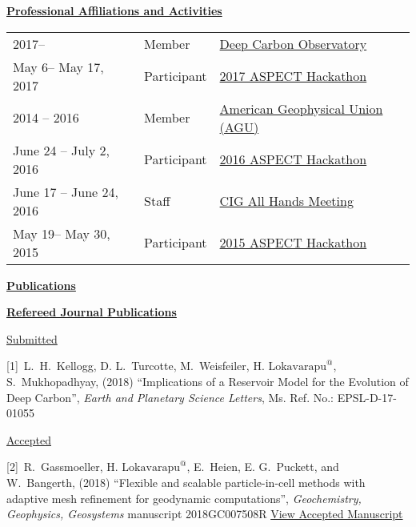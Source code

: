 \documentclass[11pt]{ltxdoc}
\begin{document}
\vskip 12pt

\begin{center}
	\textbf{\underline{Professional Affiliations and Activities}}
\end{center}

\vskip -06pt

\addtolength{\tabcolsep}{15pt}   
\begin{tabular}{lll}
  2017--     & Member & \href{https://deepcarbon.net/}{Deep Carbon Observatory} \\[06pt]
  May 6-- May 17, 2017 & Participant & \href{https://geodynamics.org/cig/events/calendar/2017-aspect-hack/}{2017 ASPECT Hackathon} \\[06pt]
  2014 -- 2016     & Member & 
 \href{ https://sites.agu.org}{ American Geophysical Union (AGU)} \\[06pt]
  June 24 -- July 2, 2016     & Participant & \href{https://geodynamics.org/cig/events/calendar/2016-cig-all-hands-meeting/2016-aspect-hack/}{2016 ASPECT Hackathon} \\[06pt]
  June 17 -- June 24, 2016  & Staff & \href{https://geodynamics.org/cig/events/calendar/2016-cig-all-hands-meeting/}{CIG All Hands Meeting} \\[06pt]
  May 19-- May 30, 2015 & Participant & \href{https://geodynamics.org/cig/events/calendar/2015-aspect-hackathon/}{2015 ASPECT Hackathon} \\[06pt]
\end{tabular}
\addtolength{\tabcolsep}{1pt}  

\newpage

\begin{center}
  \textbf{\underline{Publications}}
\end{center}

\noindent
\textbf{\underline{Refereed Journal Publications}}


\noindent
\underline{Submitted}

\hangindent 20pt
[1]~L.~H.~Kellogg, D. L.~Turcotte, M.~Weisfeiler, $\textrm{H.~Lokavarapu}^@$, S.~Mukhopadhyay, (2018) 
``Implications of a Reservoir Model for the
Evolution of Deep Carbon'', 
\textit{Earth and Planetary Science Letters}, Ms. Ref. No.:  EPSL-D-17-01055

\noindent
\underline{Accepted}

\hangindent 20pt
[2]~R.~Gassmoeller,  $\textrm{H.~Lokavarapu}^@$, E.~Heien, E. G.~Puckett, and W.~Bangerth, (2018) 
``Flexible and scalable particle-in-cell methods with adaptive mesh refinement for geodynamic computations'', 
\textit{Geochemistry, Geophysics, Geosystems} manuscript 2018GC007508R 
\href{https://www.math.ucdavis.edu/~egp/PUBLICATIONS/JOURNAL_ARTICLES/ACCEPTED/RG-HL-EH-EGP-WB-2018.pdf}{View Accepted Manuscript}
\end{document}
